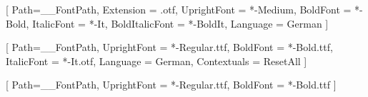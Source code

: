     \else
        \setmainfont{MinionPro}[
            Path=\__FontPath,
            Extension = .otf,
            UprightFont = *-Medium,
            BoldFont = *-Bold, %
            ItalicFont = *-It, %
            BoldItalicFont = *-BoldIt, %
            Language = German
        ] %

        \setsansfont{Myriad-Pro}[ %
            Path=\__FontPath, 
            UprightFont = *-Regular.ttf,
            BoldFont = *-Bold.ttf, %
            ItalicFont = *-It.otf, %
            Language = German,
            Contextuals = ResetAll
        ]


    \fi
    
    \newfontfamily{}[
        Path=\__FontPath, 
        UprightFont = *-Regular.ttf,
        BoldFont = *-Bold.ttf
    ]
    
    
    \newfontfamily{}
    \newcommand\teilt{\mathbin{\text{\JHSymbolFont{d}}}}
    \newcommand\assoz{\mathbin{\text{\JHSymbolFont{a}}}}
    \newcommand\vielf{\mathbin{\text{\JHSymbolFont{m}}}}
\fi
        






